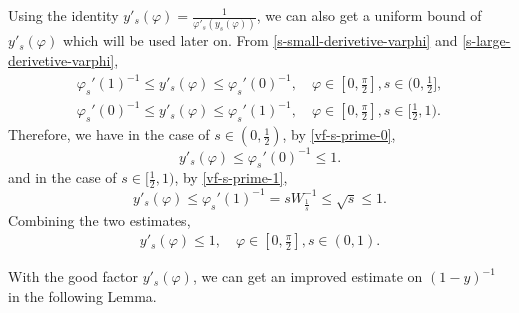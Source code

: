 \documentclass[reqno,10pt]{amsart}
\let\vf=\varphi
\newcommand{\ben}{\begin{eqnarray}}
\newcommand{\een}{\end{eqnarray}}
\theoremstyle{definition}
\numberwithin{equation}{section}
\begin{document}
Using the identity $y'_s(\vf)=\frac{1}{\vf'_s(y_s(\vf))}$, we can also get a uniform bound of $y'_s(\vf)$ which will be used later on. From \eqref{s-small-derivetive-varphi}
and \eqref{s-large-derivetive-varphi},
$$
\begin{aligned}
	\vf_s'(1)^{-1}\le y'_s(\vf)\le \vf_s'(0)^{-1}, \quad  \vf\in[0,\frac{\pi}{2}],s\in(0,\frac{1}{2}],\\
	\vf_s'(0)^{-1}\le y'_s(\vf)\le \vf_s'(1)^{-1}, \quad  \vf\in[0,\frac{\pi}{2}],s\in[\frac{1}{2},1).
\end{aligned}
$$
Therefore, we have in the case of $s\in(0,\frac{1}{2})$, by \eqref{vf-s-prime-0},
$$y'_s(\vf)\le \vf_s'(0)^{-1}\le 1.$$
and in the case of $s\in[\frac{1}{2},1)$,  by \eqref{vf-s-prime-1},
$$y'_s(\vf)\le \vf_s'(1)^{-1}=sW_{\frac{1}{s}}^{-1}\le \sqrt{s} \leq 1.$$
Combining the two estimates, 
\ben\label{upper bound of y'}
y'_s(\vf)\le 1, \quad  \vf\in[0,\frac{\pi}{2}], s\in(0,1).
\een

With the good factor $y'_s(\vf)$, we can get an improved estimate on $(1-y)^{-1}$
in the following Lemma.
\end{document}
